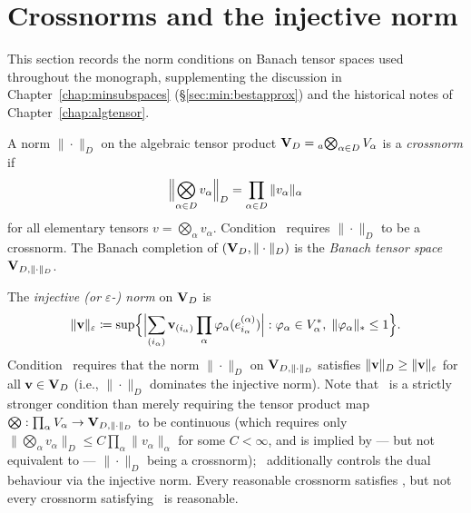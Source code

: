 \section{Crossnorms and the injective norm}
\label{app:functional:crossnorms}

This section records the norm conditions on Banach tensor spaces used
throughout the monograph, supplementing the discussion in
Chapter~\ref{chap:minsubspaces} (\S\ref{sec:min:bestapprox}) and
the historical notes of Chapter~\ref{chap:algtensor}.

\begin{definition}
\label{def:app:crossnorm}
A norm $\|\cdot\|_D$ on the algebraic tensor product
$\mathbf{V}_D = {}_a\!\bigotimes_{\alpha \in D} V_\alpha$ is a \emph{crossnorm}
if
\begin{equation}
    \Bigl\|\bigotimes_{\alpha \in D} v_\alpha\Bigr\|_D
    = \prod_{\alpha \in D} \|v_\alpha\|_\alpha
\end{equation}
for all elementary tensors $v = \bigotimes_\alpha v_\alpha$.
Condition \condCROSS\ requires $\|\cdot\|_D$ to be a crossnorm.
The Banach completion of $(\mathbf{V}_D, \|\cdot\|_D)$ is the
\emph{Banach tensor space} $\mathbf{V}_{D,\|\cdot\|_D}$.
\end{definition}

\begin{definition}
\label{def:app:injnorm}
The \emph{injective (or $\varepsilon$-) norm} on $\mathbf{V}_D$ is
\begin{equation}
    \|\mathbf{v}\|_\varepsilon \coloneqq
    \sup\Bigl\{
    \Bigl|\sum_{(i_\alpha)} \mathbf{v}_{(i_\alpha)}
    \prod_\alpha \varphi_\alpha(e^{(\alpha)}_{i_\alpha})\Bigr|
    :
    \varphi_\alpha \in V_\alpha^*,\; \|\varphi_\alpha\|_* \leq 1
    \Bigr\}.
\end{equation}
Condition \condINJ\ requires that the norm $\|\cdot\|_D$ on $\mathbf{V}_{D,\|\cdot\|_D}$
satisfies $\|\mathbf{v}\|_D \geq \|\mathbf{v}\|_\varepsilon$ for all $\mathbf{v} \in \mathbf{V}_D$
(i.e., $\|\cdot\|_D$ dominates the injective norm). Note that \condINJ\
is a strictly stronger condition than merely requiring the tensor product
map $\bigotimes: \prod_\alpha V_\alpha \to \mathbf{V}_{D,\|\cdot\|_D}$ to be continuous
(which requires only $\|\bigotimes_\alpha v_\alpha\|_D \leq C\prod_\alpha
\|v_\alpha\|_\alpha$ for some $C < \infty$, and is implied by — but not
equivalent to — $\|\cdot\|_D$ being a crossnorm); \condINJ\
additionally controls the dual behaviour via the injective norm.
Every reasonable crossnorm satisfies \condINJ, but not every crossnorm
satisfying \condINJ\ is reasonable.
\end{definition}


